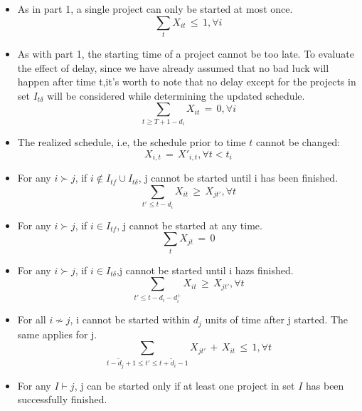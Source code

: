 \documentclass[final,3p,times]{elsarticle}
\begin{document}
\begin{itemize}\label{StartCon1}
	\item As in part 1, a single project can only be started at most once.
	\begin{equation}
		\sum\limits_{t} X_{it}\,\leq\,1,\forall i
	\end{equation}
	\item As with part 1, the starting time of a project cannot be too late. To evaluate the effect of delay, since we have already assumed that no bad luck will happen after time t,it's worth to note that no delay except for the projects in set $I_{t\delta}$ will be considered while determining the updated schedule.
	\begin{equation}
		\label{EqnStartOnlyOnce2}
		\sum\limits_{t\geq T+1-d_i} X_{it}\,=\,0, \forall i
	\end{equation}
	\item The realized schedule, i.e, the schedule prior to time $t$ cannot be changed:
	\begin{equation}
		X_{i,t}\,=\,X'_{i,t}, \forall t < t_i
	\end{equation}
	\item For any $i\succ j$, if $i\notin I_{tf}\cup I_{t\delta}$, j cannot be started until i has been finished.                 
	\begin{equation}
		\sum\limits_{t'\leq t-d_i} X_{it} \,\geq\, X_{jt'},\forall t 
	\end{equation} 
	\item For any $i\succ j$, if $i\in I_{tf}$, j cannot be started at any time.
	\begin{equation}
		\sum\limits_{t} X_{jt}\,=\,0
	\end{equation}
	\item For any $i\succ j$, if $i\in I_{t\delta}$,j cannot be started until i hazs finished.
	\begin{equation}
		\sum\limits_{t'\leq t-d_i-d^+_i} X_{it} \,\geq\, X_{jt'},\forall  t 
	\end{equation}
	\item For all $i \nsim j$, i cannot be started within $d_j$ units of time after j started. The same applies for j.
	\begin{equation}
		\sum\limits_{t-\tilde{d}_j+1\leq t'\leq t+\tilde{d}_i-1} X_{jt'}\,+\,X_{it}\,\leq\,1, \forall t 
	\end{equation}
	\item For any $I \vdash j$, j can be started only if at least one project in set $I$ has been successfully finished. 

\end{itemize}
\end{document}
